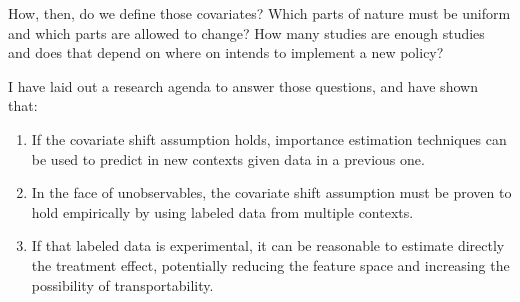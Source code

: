 \documentclass[a4paper,12pt]{article}
\begin{document}
How, then, do we define those covariates? Which parts of nature must be uniform and which parts are allowed to change? How many studies are enough studies and does that depend on where on intends to implement a new policy?

I have laid out a research agenda to answer those questions, and have shown that:  

\begin{enumerate}
\item If the covariate shift assumption holds, importance estimation techniques can be used to predict in new contexts given data in a previous one. 
\item In the face of unobservables, the covariate shift assumption must be proven to hold empirically by using labeled data from multiple contexts.
\item If that labeled data is experimental, it can be reasonable to estimate directly the treatment effect, potentially reducing the feature space and increasing the possibility of transportability. 
\end{enumerate}







\end{document}
